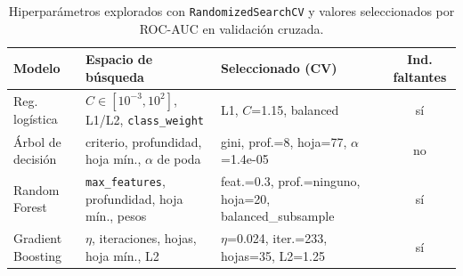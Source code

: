 \begin{table}[!tp]
\centering
\footnotesize
\caption{Hiperparámetros explorados con \texttt{RandomizedSearchCV} y valores seleccionados por ROC-AUC en validación cruzada.}
\label{tab:hparams}
\setlength{\tabcolsep}{4pt}
\begin{tabular}{lp{5.2cm}p{6.6cm}c}
\toprule
Modelo & Espacio de búsqueda & Seleccionado (CV) & Ind. faltantes \\
\midrule
Reg. logística & $C\in[10^{-3},10^{2}]$, L1/L2, \texttt{class\_weight} & L1, $C$=1.15, balanced & sí \\
Árbol de decisión & criterio, profundidad, hoja mín., $\alpha$ de poda & gini, prof.=8, hoja=77, $\alpha$=1.4e-05 & no \\
Random Forest & \texttt{max\_features}, profundidad, hoja mín., pesos & feat.=0.3, prof.=ninguno, hoja=20, balanced\_subsample & sí \\
Gradient Boosting & $\eta$, iteraciones, hojas, hoja mín., L2 & $\eta$=0.024, iter.=233, hojas=35, L2=1.25 & sí \\
\bottomrule
\end{tabular}
\end{table}
